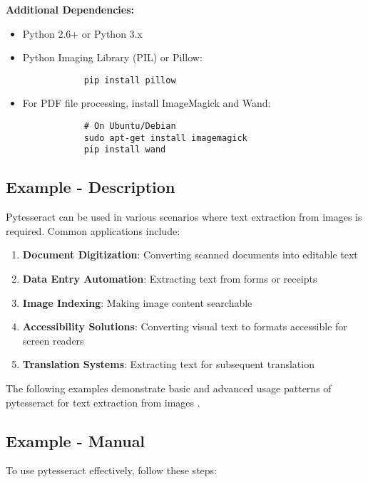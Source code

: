 \documentclass{article}
\begin{document}
	\textbf{Additional Dependencies:}
	\begin{itemize}
		\item Python 2.6+ or Python 3.x
		\item Python Imaging Library (PIL) or Pillow:
		\begin{lstlisting}
			pip install pillow
		\end{lstlisting}
		\item For PDF file processing, install ImageMagick and Wand:
		\begin{lstlisting}
			# On Ubuntu/Debian
			sudo apt-get install imagemagick
			pip install wand
		\end{lstlisting}
	\end{itemize}
	
	\subsection{Example - Description}
	Pytesseract can be used in various scenarios where text extraction from images is required. Common applications include:
	
	\begin{enumerate}
		\item \textbf{Document Digitization}: Converting scanned documents into editable text
		\item \textbf{Data Entry Automation}: Extracting text from forms or receipts
		\item \textbf{Image Indexing}: Making image content searchable
		\item \textbf{Accessibility Solutions}: Converting visual text to formats accessible for screen readers
		\item \textbf{Translation Systems}: Extracting text for subsequent translation
	\end{enumerate}
	
	The following examples demonstrate basic and advanced usage patterns of pytesseract for text extraction from images \cite {Betterpath:2023, DataCamp:2024}.
	
	\subsection{Example - Manual}
	To use pytesseract effectively, follow these steps:
	
\end{document}
